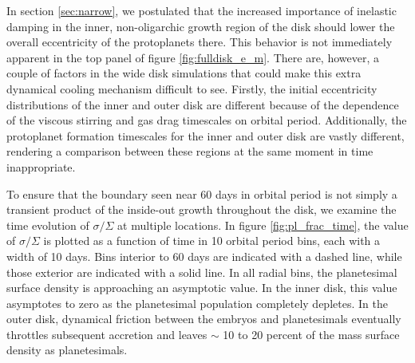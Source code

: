 \documentclass[twocolumn]{aastex63}
\begin{document}
In section \ref{sec:narrow}, we postulated that the increased importance of inelastic damping in the inner, non-oligarchic growth region of the disk should lower the overall eccentricity of the protoplanets there. This behavior is not immediately apparent in the top panel of figure \ref{fig:fulldisk_e_m}. There are, however, a couple of factors in the wide disk simulations that could make this extra dynamical cooling mechanism difficult to see. Firstly, the initial eccentricity distributions of the inner and outer disk are different because of the dependence of the viscous stirring and gas drag timescales on orbital period. Additionally, the protoplanet formation timescales for the inner and outer disk are vastly different, rendering a comparison between these regions at the same moment in time inappropriate.



To ensure that the boundary seen near 60 days in orbital period is not
simply a transient product of the inside-out growth throughout the
disk, we examine the time evolution of $\sigma/\Sigma$ at multiple
locations. In figure \ref{fig:pl_frac_time}, the value of
$\sigma/\Sigma$ is plotted as a function of time in 10 orbital period
bins, each with a width of 10 days.
Bins interior to 60 days are indicated with a dashed line, while those exterior are indicated with a solid line. In all radial bins, the planetesimal surface density is approaching an asymptotic value. In the inner disk, this value asymptotes to zero as the planetesimal population completely depletes. In the outer disk, dynamical friction between the embryos and planetesimals eventually throttles subsequent accretion and leaves $\sim$ 10 to 20 percent of the mass surface density as planetesimals.
\end{document}
